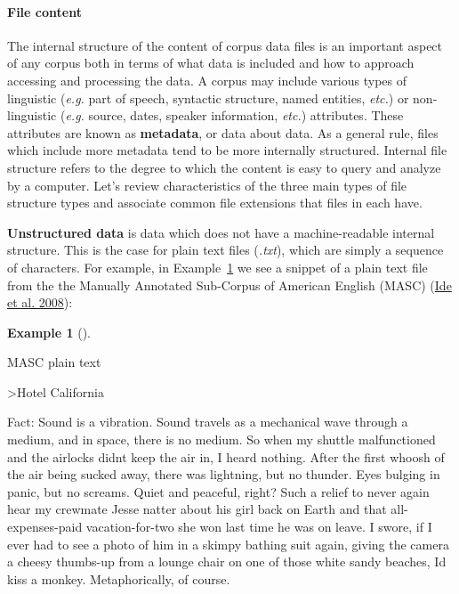 \documentclass[
  letterpaper,
  DIV=11,
  numbers=noendperiod]{scrreport}
\let\oldparagraph\paragraph
\renewcommand{\paragraph}[1]{\oldparagraph{#1}\mbox{}}
\newenvironment{Shaded}{\begin{snugshade}}{\end{snugshade}}
\newcommand{\NormalTok}[1]{\textcolor[rgb]{0.00,0.00,0.00}{#1}}
\theoremstyle{definition}
\newtheorem{example}{Example}[chapter]
\theoremstyle{remark}
\begin{document}
\hypertarget{file-content}{%
\paragraph{File content}\label{file-content}}

The internal structure of the content of corpus data files is an
important aspect of any corpus both in terms of what data is included
and how to approach accessing and processing the data. A corpus may
include various types of linguistic (\emph{e.g.} part of speech,
syntactic structure, named entities, \emph{etc.}) or non-linguistic
(\emph{e.g.} source, dates, speaker information, \emph{etc.})
attributes. These attributes are known as \textbf{metadata}, or data
about data. As a general rule, files which include more metadata tend to
be more internally structured. Internal file structure refers to the
degree to which the content is easy to query and analyze by a computer.
Let's review characteristics of the three main types of file structure
types and associate common file extensions that files in each have.

\textbf{Unstructured data} is data which does not have a
machine-readable internal structure. This is the case for plain text
files (\emph{.txt}), which are simply a sequence of characters. For
example, in Example~\ref{exm-masc-text} we see a snippet of a plain text
file from the the Manually Annotated Sub-Corpus of American English
(MASC) (\protect\hyperlink{ref-Ide2008}{Ide et al. 2008}):

\begin{example}[]\protect\hypertarget{exm-masc-text}{}\label{exm-masc-text}

MASC plain text

\begin{Shaded}
\begin{Highlighting}[]
\NormalTok{\textgreater{}Hotel California}

\NormalTok{Fact: Sound is a vibration. Sound travels as a mechanical wave through a medium, and in space, there is no}
\NormalTok{medium. So when my shuttle malfunctioned and the airlocks didn\textquotesingle{}t keep the air in, I heard nothing. After the}
\NormalTok{first whoosh of the air being sucked away, there was lightning, but no thunder. Eyes bulging in}
\NormalTok{panic, but no screams. Quiet and peaceful, right? Such a relief to never again hear my crewmate Jesse natter}
\NormalTok{about his girl back on Earth and that all{-}expenses{-}paid vacation{-}for{-}two she won last time he was on leave. I}
\NormalTok{swore, if I ever had to see a photo of him in a skimpy bathing suit again, giving the camera a cheesy thumbs{-}up}
\NormalTok{from a lounge chair on one of those white sandy beaches, I\textquotesingle{}d kiss a monkey. Metaphorically, of course.}
\end{Highlighting}
\end{Shaded}

\end{example}
\end{document}
